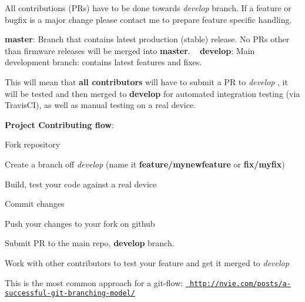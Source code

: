 All contributions (PRs) have to be done towards {\itshape develop} branch. If a feature or bugfix is a major change please contact me to prepare feature specific handling.

{\bfseries{master}}\+: Branch that contains latest production (stable) release. No PRs other than firmware releases will be merged into {\bfseries{master}}. ~\newline
 {\bfseries{develop}}\+: Main development branch\+: contains latest features and fixes.

This will mean that {\bfseries{all contributors}} will have to submit a PR to {\itshape develop} , it will be tested and then merged to {\bfseries{develop}} for automated integration testing (via Travis\+CI), as well as manual testing on a real device.

{\bfseries{Project Contributing flow}}\+:
\begin{DoxyItemize}
\item Fork repository
\item Create a branch off {\itshape develop} (name it {\bfseries{feature/mynewfeature}} or {\bfseries{fix/myfix}})
\item Build, test your code against a real device
\item Commit changes
\item Push your changes to your fork on github
\item Submit PR to the main repo, {\bfseries{develop}} branch.
\item Work with other contributors to test your feature and get it merged to {\itshape develop}
\end{DoxyItemize}

This is the most common approach for a git-\/flow\+: \href{http://nvie.com/posts/a-successful-git-branching-model/}{\texttt{ http\+://nvie.\+com/posts/a-\/successful-\/git-\/branching-\/model/}} 